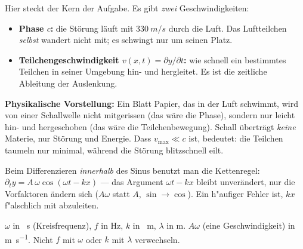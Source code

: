 \begin{werkzeugkasten}
Hier steckt der Kern der Aufgabe. Es gibt \emph{zwei} Geschwindigkeiten:

\begin{itemize}
  \item \textbf{Phase $c$:} die Störung läuft mit $\qty{330}{m/s}$ durch die
        Luft. Das Luftteilchen \emph{selbst} wandert nicht mit; es schwingt
        nur um seinen Platz.
  \item \textbf{Teilchengeschwindigkeit $v(x,t)=\partial y/\partial t$:} wie
        schnell ein bestimmtes Teilchen in seiner Umgebung hin- und
        hergleitet. Es ist die zeitliche Ableitung der Auslenkung.
\end{itemize}

\textbf{Physikalische Vorstellung:} Ein Blatt Papier, das in der Luft
schwimmt, wird von einer Schallwelle nicht mitgerissen (das wäre die Phase),
sondern nur leicht hin- und hergeschoben (das wäre die Teilchenbewegung).
Schall überträgt \emph{keine} Materie, nur Störung und Energie. Dass
$v_{\max}\ll c$ ist, bedeutet: die Teilchen taumeln nur minimal, während die
Störung blitzschnell eilt.
\end{werkzeugkasten}

\begin{achtung}
Beim Differenzieren \emph{innerhalb} des Sinus benutzt man die Kettenregel:
$\partial_t y = A\,\omega\cos(\omega t-kx)$ --- das Argument $\omega t-kx$
bleibt unverändert, nur die Vorfaktoren ändern sich ($A\omega$ statt $A$,
$\sin\rightarrow\cos$). Ein h"aufiger Fehler ist, $kx$ f"alschlich mit
abzuleiten.
\end{achtung}

\begin{achtung}
$\omega$ in \unit{\per\second} (Kreisfrequenz), $f$ in \unit{\hertz},
$k$ in \unit{\per\metre}, $\lambda$ in \unit{\metre}. $A\omega$ (eine
Geschwindigkeit) in \unit{\metre\per\second}. Nicht $f$ mit $\omega$ oder
$k$ mit $\lambda$ verwechseln.
\end{achtung}
